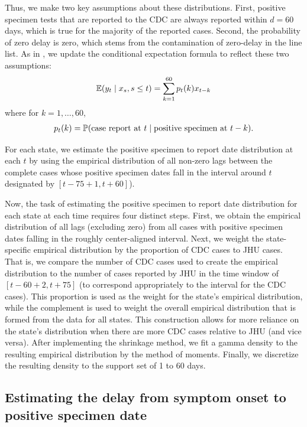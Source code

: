 \documentclass{article}
\begin{document}
Thus, we make two key assumptions about these distributions. First,
positive specimen tests that are reported to the CDC are always reported within $d = 60$
days, which is true for the majority of the reported cases. Second, the
probability of zero delay is zero, which stems from the contamination of
zero-delay in the line list. As in \citet{jahja2022real}, we update the
conditional expectation formula to reflect these two assumptions: 
\begin{align*}
\E(y_t \mid x_s, s \leq t) = \sum_{k=1}^{60} p_t(k) x_{t-k}
\end{align*}
where for $k = 1, \dots, 60$,
\begin{align*}
p_t(k) = \P(\text{case report at }t \mid \text{positive specimen at }t-k).
\end{align*}

For each state, we estimate the positive specimen to report date distribution
 at each $t$ by using the empirical distribution of
all non-zero lags between the complete cases whose positive specimen dates fall in the
 interval around $t$ designated by $[ t - 75 + 1, t + 60]$). 

Now, the task of estimating the positive specimen to report date distribution
 for each state at each time requires four distinct steps. First, we obtain the empirical
distribution of all lags (excluding zero) from all cases with positive specimen dates
falling in the roughly center-aligned interval. Next, we weight the state-specific
empirical distribution by the proportion of CDC cases to JHU cases. That is, we
compare the number of CDC cases used to create the empirical distribution to the
number of cases reported by JHU in the time window of $\left[t - 60 + 2, t +
75\right]$ (to correspond appropriately to the interval for
the CDC cases). This proportion is used as the weight for the state's empirical
distribution, while the complement is used to weight the overall empirical
distribution that is formed from the data for all states. This construction
allows for more reliance on the state's distribution when there are more CDC
cases relative to JHU (and vice versa). After implementing the shrinkage method,
we fit a gamma density to the resulting empirical distribution by the method of
moments. Finally, we discretize the resulting density to the support set of 1
to 60 days.
 
\subsection{Estimating the delay from symptom onset to positive specimen date}  \label{delaystop} %
\end{document}
